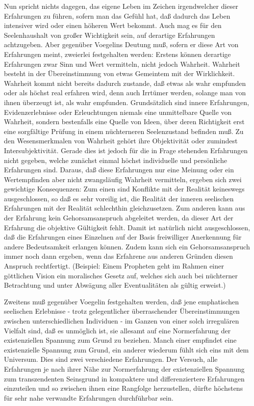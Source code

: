 Nun spricht nichts dagegen, das eigene Leben im Zeichen irgendwelcher dieser
Erfahrungen zu führen, sofern man das Gefühl hat, daß dadurch das Leben
intensiver wird oder einen höheren Wert bekommt. Auch mag es für den
Seelenhaushalt von großer Wichtigkeit sein, auf derartige Erfahrungen
achtzugeben. Aber gegenüber Voegelins Deutung muß, sofern er diese Art von
Erfahrungen meint, zweierlei festgehalten werden: Erstens können derartige
Erfahrungen zwar Sinn und Wert vermitteln, nicht jedoch Wahrheit. Wahrheit
besteht in der Übereinstimmung von etwas Gemeintem mit der Wirklichkeit.
Wahrheit kommt nicht bereits dadurch zustande, daß etwas als wahr empfunden
oder als höchst real erfahren wird, denn auch Irrtümer werden, solange man von
ihnen überzeugt ist, als wahr empfunden. Grundsätzlich sind innere
Erfahrungen, Evidenzerlebnisse oder Erleuchtungen niemals eine unmittelbare
Quelle von Wahrheit, sondern bestenfalls eine Quelle von Ideen, über deren
Richtigkeit erst eine sorgfältige Prüfung in einem nüchterneren
Seelenzustand befinden muß. Zu den Wesensmerkmalen von Wahrheit gehört ihre
Objektivität oder zumindest Intersubjektivität. Gerade dies ist jedoch für die
in Frage stehenden Erfahrungen nicht gegeben, welche zunächst einmal höchst
individuelle und persönliche Erfahrungen sind. Daraus, daß diese Erfahrungen
nur eine Meinung oder ein Wertempfinden aber nicht zwangsläufig Wahrheit
vermitteln, ergeben sich zwei gewichtige Konsequenzen: Zum einen sind
Konflikte mit der Realität keineswegs ausgeschlossen, so daß es sehr voreilig
ist, die Realität der inneren seelischen Erfahrungen mit der Realität
schlechthin gleichzusetzen. Zum anderen kann aus der Erfahrung kein
Gehorsamsanspruch abgeleitet werden, da dieser Art der Erfahrung die objektive
Gültigkeit fehlt.  Damit ist natürlich nicht ausgeschlossen, daß die
Erfahrungen eines Einzelnen auf der Basis freiwilliger Anerkennung für andere
Bedeutsamkeit erlangen können. Zudem kann sich ein Gehorsamsanspruch immer
noch dann ergeben, wenn das Erfahrene aus anderen Gründen diesen Anspruch
rechtfertigt. (Beispiel: Einem Propheten geht im Rahmen einer göttlichen
Vision ein moralisches Gesetz auf, welches sich auch bei nüchterner
Betrachtung und unter Abwägung aller Eventualitäten als gültig erweist.)
  
Zweitens muß gegenüber Voegelin festgehalten werden, daß jene emphatischen
seelischen Erlebnisse - trotz gelegentlicher überraschender Übereinstimmungen
zwischen unterschiedlichen Individuen - im Ganzen von einer solch irregulären
Vielfalt sind, daß es unmöglich ist, sie allesamt auf eine Normerfahrung der
existenziellen Spannung zum Grund zu beziehen. Manch einer empfindet eine
existenzielle Spannung zum Grund, ein anderer wiederum fühlt sich eins mit
dem Universum. Dies sind zwei verschiedene Erfahrungen. Der Versuch, alle
Erfahrungen je nach ihrer Nähe zur Normerfahrung der existenziellen Spannung
zum transzendenten Seinsgrund in kompaktere und differenziertere Erfahrungen
einzuteilen und so zwischen ihnen eine Rangfolge herzustellen, dürfte
höchstens für sehr nahe verwandte Erfahrungen durchführbar sein.

